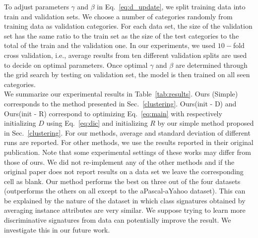 \documentclass[10pt,twocolumn,letterpaper]{article}
\begin{document}
To adjust parameters $\gamma$ and $\beta$ in Eq.~\ref{eq:d_update}, we split training data into train and validation sets.
We choose a number of categories randomly from training data as validation categories. For each data set, the size of the
validation set has the same ratio to the train set as the size of the test categories to the total of the train and the validation one.
In our experiments, we used $10-$fold cross validation, i.e., average results from ten different validation splits are used to decide on
optimal parameters.
Once optimal $\gamma$ and $\beta$ are determined through the grid search by testing on validation set, the model
is then trained on all seen categories.\\
We summarize our experimental results in Table~\ref{tab:results}.
Ours (Simple) corresponds to the method presented in Sec.~\ref{clustering}.
Ours(init - D) and Ours(init - R) correspond to optimizing Eq.~\eqref{eq:main}
with respectively initializing $D$ using Eq.~\eqref{eq:dic} and initializing $R$ by our simple method proposed in Sec.~\ref{clustering}.
For our methods, average and standard deviation of different runs are reported.
 For other methods, we use the results reported in their original publication. Note that some experimental settings of these works may differ from those of ours. We did not re-implement any of the other methods and if the original paper does not report results on a data set we leave the corresponding cell as blank.
Our method performs the best on three out of the four datasets (outperforms the others on all except to the aPascal-aYahoo dataset). This can be explained by the nature of the dataset in which class signatures obtained by averaging instance attributes are very similar. We suppose trying to learn
more discriminative signatures from data can potentially improve the result. We investigate this in our future work.

\end{document}
